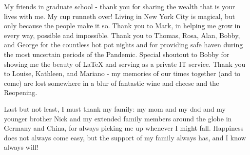 \documentclass[phd,tocprelim]{cornell}
\begin{document}
\begin{acknowledgements}
My friends in graduate school - thank you for sharing the wealth that is your lives with me. My cup runneth over! Living in New York City is magical, but only because the people make it so. Thank you to Mark, in helping me grow in every way, possible and impossible. Thank you to Thomas, Rosa, Alan, Bobby, and George for the countless hot pot nights and for providing safe haven during the most uncertain periods of the Pandemic. Special shoutout to Bobby for showing me the beauty of LaTeX and serving as a private IT service. Thank you to Louise, Kathleen, and Mariano - my memories of our times together (and to come) are lost somewhere in a blur of fantastic wine and cheese and the Reopening.

Last but not least, I must thank my family: my mom and my dad and my younger brother Nick and my extended family members around the globe in Germany and China, for always picking me up whenever I might fall. Happiness does not always come easy, but the support of my family always has, and I know always will!
\end{acknowledgements}

\contentspage
\tablelistpage
\figurelistpage
\end{document}
